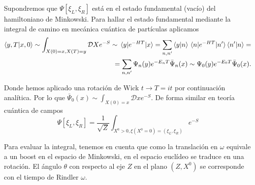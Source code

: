 Supondremos que $\Psi[\xi_L,\xi_R]$ está en el estado fundamental (vacío) del hamiltoniano
de Minkowski. Para hallar el estado fundamental mediante la integral de camino 
en mecánica cuántica de partículas aplicamos
\begin{align}
  \braket{y,T}{x,0}\sim \int_{X(0)=x,X(T)=y} \mathcal D X e^{-S} \sim 
  \mel{y}{e^{-HT}}{x}=\sum_{n,n'} \ip{y}{n}\mel{n}{e^{-HT}}{n'}\ip{n'}{n}=\\
  =\sum_{n,n'} \Psi_n(y) e^{-E_n T} \bar{\Psi}_n(x)\sim   \Psi_0(y) e^{-E_0 T} \bar{\Psi}_0(x).
\end{align}

Donde hemos aplicado una rotación de Wick $t\to T=it$ por continuación analítica.
Por lo que $\bar{\Psi}_0(x)\sim \int_{X(0)=x} \mathcal D x e^{-S}$.
De forma similar en teoría cuántica de campos 
\begin{equation}
  \Psi[\xi_L,\xi_R]=\frac{1}{\sqrt{Z}}\int_{X^0>0, \xi(X^0=0)=(\xi_L,\xi_R)} e^{-S}
\end{equation}

Para evaluar la integral, tenemos en cuenta que como la translación en $\omega$
equivale a un boost en el espacio de Minkowski, en el espacio euclídeo se traduce
en una rotación.
El ángulo $\theta$ con respecto al eje $Z$ en el plano $(Z,X^0)$ se corresponde con
el tiempo de Rindler $\omega$.
